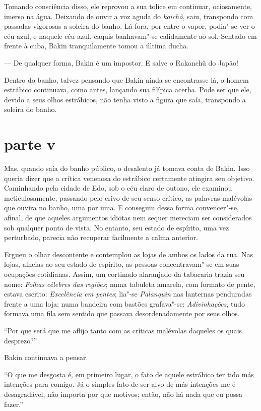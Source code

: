 Tomando consciência disso, ele reprovou a sua tolice em continuar,
ociosamente, imerso na água. Deixando de ouvir a voz aguda do
\textit{koichô}, saiu, transpondo com passadas vigorosas a soleira do
banho. Lá fora, por entre o vapor, podia"-se ver o céu azul, e naquele
céu azul, caquis banhavam"-se calidamente ao sol. Sentado em frente à
cuba, Bakin tranquilamente tomou a última ducha.

--- De qualquer forma, Bakin é um impostor. E salve o Rakanchû do Japão!

Dentro do banho, talvez pensando que Bakin ainda se encontrasse lá, o
homem estrábico continuava, como antes, lançando sua filípica acerba.
Pode ser que ele, devido a seus olhos estrábicos, não tenha visto a
figura que saía, transpondo a soleira do banho.

\section*{parte v}

Mas, quando saía do banho público, o desalento já tomava conta de Bakin.
Isso queria dizer que a crítica venenosa do estrábico certamente
atingira seu objetivo. Caminhando pela cidade de Edo, sob o céu claro
de outono, ele examinou meticulosamente, passando pelo crivo de seu
senso crítico, as palavras malévolas que ouvira no banho, uma por uma.
E  conseguiu dessa forma convencer"-se, afinal, de que aqueles 
argumentos idiotas nem sequer mereciam ser considerados sob qualquer
ponto de vista. No entanto, seu estado de espírito, uma vez perturbado,
parecia não recuperar facilmente a calma anterior.

Ergueu o olhar descontente e contemplou as lojas de ambos os lados da
rua. Nas lojas, alheias ao seu estado de espírito, as pessoas
concentravam"-se em suas ocupações cotidianas. 
Assim, um cortinado alaranjado da tabacaria trazia seu nome: 
\textit{Folhas célebres das regiões}; numa tabuleta amarela, com formato de pente, 
estava escrito: \textit{Excelência em pentes}; lia"-se \textit{Palanquin} nas lanternas 
penduradas frente a uma loja; numa bandeira com bastões grafava"-se: \textit{Adivinhações}, 
tudo formava uma fila sem sentido que passava desordenadamente por seus olhos.

``Por que será que me aflijo tanto com as críticas malévolas daqueles os
quais desprezo?''

Bakin continuava a pensar.

``O que me desgosta é, em primeiro lugar, o fato de aquele estrábico ter
tido más intenções para comigo. Já o simples fato de ser alvo de más
intenções me é desagradável, não importa por que motivos; então, não há
nada que eu possa fazer.''

